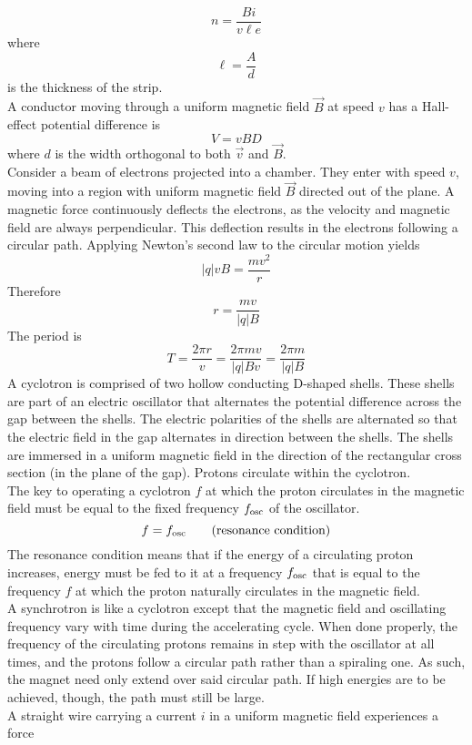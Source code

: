 \documentclass{subfiles}
\begin{document}
		\[n = \frac{Bi}{v\ell e}\]
		where
		\[\ell = \frac{A}{d}\]
		is the thickness of the strip. \\
	A conductor moving through a uniform magnetic field \(\vec{B}\) at speed \(v\) has a Hall-effect potential difference is
		\[V = vBD \tag{Hall-effect potential difference}\]
		where \(d\) is the width orthogonal to both \(\vec{v}\) and \(\vec{B}\). \\
	Consider a beam of electrons projected into a chamber. They enter with speed \(v\), moving into a region with uniform magnetic field \(\vec{B}\) directed out of the plane. A magnetic force continuously deflects the electrons, as the velocity and magnetic field are always perpendicular. This deflection results in the electrons following a circular path. Applying Newton's second law to the circular motion yields
		\[|q|vB = \frac{mv^2}{r}\]
		Therefore
		\[r = \frac{mv}{|q|B}\]
		The period is
		\[
			T = \frac{2\pi r}{v}
				= \frac{2\pi mv}{|q|Bv}
			 	= \frac{2\pi m}{|q|B}
		\]
	A cyclotron is comprised of two hollow conducting D-shaped shells. These shells are part of an electric oscillator that alternates the potential difference across the gap between the shells. The electric polarities of the shells are alternated so that the electric field in the gap alternates in direction between the shells. The shells are immersed in a uniform magnetic field in the direction of the rectangular cross section (in the plane of the gap). Protons circulate within the cyclotron. \\
		The key to operating a cyclotron \(f\) at which the proton circulates in the magnetic field must be equal to the fixed frequency \(f_{\text{osc}}\) of the oscillator.
		\[f = f_{\text{osc}} \tag{resonance condition}\]
		The resonance condition means that if the energy of a circulating proton increases, energy must be fed to it at a frequency \(f_{\text{osc}}\) that is equal to the frequency \(f\) at which the proton naturally circulates in the magnetic field. \\
	A synchrotron is like a cyclotron except that the magnetic field and oscillating frequency vary with time during the accelerating cycle. When done properly, the frequency of the circulating protons remains in step with the oscillator at all times, and the protons follow a circular path rather than a spiraling one. As such, the magnet need only extend over said circular path. If high energies are to be achieved, though, the path must still be large. \\
	A straight wire carrying a current \(i\) in a uniform magnetic field experiences a force
\end{document}
